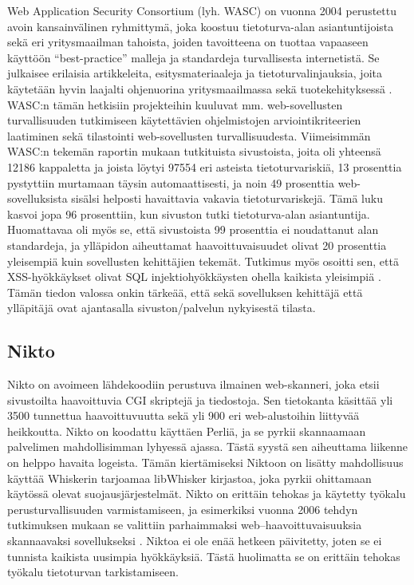 Web Application Security Consortium (lyh. WASC) on vuonna 2004 perustettu avoin kansainvälinen ryhmittymä, joka koostuu tietoturva-alan asiantuntijoista sekä eri 
yritysmaailman tahoista, joiden tavoitteena on tuottaa vapaaseen käyttöön ``best-practice'' malleja ja standardeja turvallisesta internetistä. Se julkaisee
erilaisia artikkeleita, esitysmateriaaleja ja tietoturvalinjauksia, joita käytetään hyvin laajalti ohjenuorina yritysmaailmassa sekä tuotekehityksessä \cite{WASC}.
WASC:n tämän hetkisiin projekteihin kuuluvat mm. web-sovellusten turvallisuuden tutkimiseen käytettävien ohjelmistojen arviointikriteerien laatiminen sekä tilastointi
web-sovellusten turvallisuudesta. Viimeisimmän WASC:n tekemän raportin mukaan tutkituista sivustoista, joita oli yhteensä 12186 kappaletta ja joista löytyi 97554 
eri asteista tietoturvariskiä, 13 prosenttia pystyttiin murtamaan täysin automaattisesti, ja noin 49 prosenttia web-sovelluksista sisälsi helposti havaittavia vakavia 
tietoturvariskejä. Tämä luku kasvoi jopa 96 prosenttiin, kun sivuston tutki tietoturva-alan asiantuntija. Huomattavaa oli myös se, että sivustoista 99 prosenttia
ei noudattanut alan standardeja, ja ylläpidon aiheuttamat haavoittuvaisuudet olivat 20 prosenttia yleisempiä kuin sovellusten kehittäjien tekemät. Tutkimus myös 
osoitti sen, että XSS-hyökkäykset olivat SQL injektiohyökkäysten ohella kaikista yleisimpiä \cite{WASCb}. Tämän tiedon valossa onkin tärkeää, että sekä sovelluksen
kehittäjä että ylläpitäjä ovat ajantasalla sivuston/palvelun nykyisestä tilasta. 

\subsection{Nikto}

Nikto \cite{Nikto} on avoimeen lähdekoodiin perustuva ilmainen web-skanneri, joka etsii sivustoilta haavoittuvia CGI skriptejä ja tiedostoja. Sen tietokanta käsittää
yli 3500 tunnettua haavoittuvuutta sekä yli 900 eri web-alustoihin liittyvää heikkoutta. Nikto on koodattu käyttäen Perliä, ja se pyrkii skannaamaan palvelimen 
mahdollisimman lyhyessä ajassa. Tästä syystä sen aiheuttama liikenne on helppo havaita logeista. Tämän kiertämiseksi Niktoon on lisätty mahdollisuus käyttää Whiskerin
tarjoamaa libWhisker kirjastoa, joka pyrkii ohittamaan käytössä olevat suojausjärjestelmät. Nikto on erittäin tehokas ja käytetty työkalu perusturvallisuuden 
varmistamiseen, ja esimerkiksi vuonna 2006 tehdyn tutkimuksen mukaan se valittiin parhaimmaksi web--haavoittuvaisuuksia skannaavaksi sovellukseksi \cite{INS}.
Niktoa ei ole enää hetkeen päivitetty, joten se ei tunnista kaikista uusimpia hyökkäyksiä. Tästä huolimatta se on erittäin tehokas työkalu tietoturvan tarkistamiseen.

